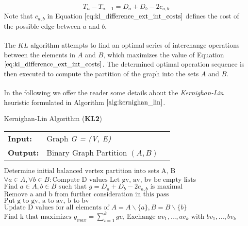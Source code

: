 \begin{equation}
	T_{n} - T_{n-1} = D_a + D_b - 2c_{a,b}
\label{eq:kl_difference_ext_int_costs}
\end{equation}
Note that $c_{a,b}$ in Equation $\ref{eq:kl_difference_ext_int_costs}$ defines the cost of the possible edge between $a$ and $b$. \\ \\
The $KL$ algorithm attempts to find an optimal series of interchange operations between the elements in $A$ and $B$, which maximizes the value of Equation $\ref{eq:kl_difference_ext_int_costs}$. The determined optimal operation sequence is then executed to compute the partition of the graph into the sets $A$ and $B$. \\ \\
In the following we offer the reader some details about the \emph{Kernighan-Lin} heuristic formulated in Algorithm $\ref{alg:kernighan_lin}$. 
\begin{algorithm}[H]
\caption{Kernighan-Lin Algorithm (\textbf{KL2})}
\begin{table}[H]
  \begin{tabular}{@{}lll@{}}
    \textbf{Input:} & Graph \emph{G = (V, E)} \\
    \textbf{Output:} & Binary Graph Partition $\left( A, B \right)$ \\
  \end{tabular} 
\end{table}
\setlength{\fboxrule}{0pt} 
\begin{boxedminipage}{1.0\textwidth}
  \begin{algorithmic}[1]
  	  \State $\text{Determine initial balanced vertex partition into sets A, B}$
      \Do
		\State $\forall a \in A, \forall b \in B: \text{Compute D values}$
		\State $\text{Let gv, av, bv be empty lists}$
			\State $\text{Find } a \in A, b \in B \text{ such that } g = D_a + D_b - 2e_{a,b} \text{ is maximal}$
			\State $\text{Remove a and b from further consideration in this pass}$
			\State $\text{Put g to gv, a to av, b to bv}$
			\State $\text{Update D values for all elements of } A = A \backslash \{a\}, B = B \backslash \{b\}$
		\EndFor
		\State $\text{Find k that maximizes } g_{max} = \sum_{i=1}^k gv_i$
			\State $\text{Exchange } av_1,\dots, av_k \text{ with } bv_1,\dots, bv_k$  
		\EndIf	
  \end{algorithmic}
  \end{boxedminipage}
  \vskip1.5pt
\label{alg:kernighan_lin}
\end{algorithm}
